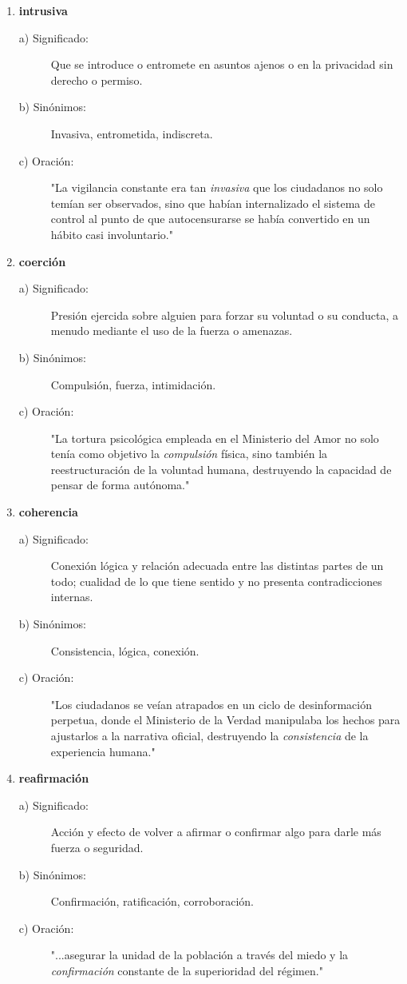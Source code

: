 \documentclass[11pt, a4paper]{article}
\begin{document}
\begin{enumerate}
    \item \textbf{intrusiva}
    \begin{description}
        \item[a) Significado:] Que se introduce o entromete en asuntos ajenos o en la privacidad sin derecho o permiso.
        \item[b) Sinónimos:] Invasiva, entrometida, indiscreta.
        \item[c) Oración:] "La vigilancia constante era tan \textit{invasiva} que los ciudadanos no solo temían ser observados, sino que habían internalizado el sistema de control al punto de que autocensurarse se había convertido en un hábito casi involuntario."
    \end{description}

    \item \textbf{coerción}
    \begin{description}
        \item[a) Significado:] Presión ejercida sobre alguien para forzar su voluntad o su conducta, a menudo mediante el uso de la fuerza o amenazas.
        \item[b) Sinónimos:] Compulsión, fuerza, intimidación.
        \item[c) Oración:] "La tortura psicológica empleada en el Ministerio del Amor no solo tenía como objetivo la \textit{compulsión} física, sino también la reestructuración de la voluntad humana, destruyendo la capacidad de pensar de forma autónoma."
    \end{description}

    \item \textbf{coherencia}
    \begin{description}
        \item[a) Significado:] Conexión lógica y relación adecuada entre las distintas partes de un todo; cualidad de lo que tiene sentido y no presenta contradicciones internas.
        \item[b) Sinónimos:] Consistencia, lógica, conexión.
        \item[c) Oración:] "Los ciudadanos se veían atrapados en un ciclo de desinformación perpetua, donde el Ministerio de la Verdad manipulaba los hechos para ajustarlos a la narrativa oficial, destruyendo la \textit{consistencia} de la experiencia humana."
    \end{description}

    \item \textbf{reafirmación}
    \begin{description}
        \item[a) Significado:] Acción y efecto de volver a afirmar o confirmar algo para darle más fuerza o seguridad.
        \item[b) Sinónimos:] Confirmación, ratificación, corroboración.
        \item[c) Oración:] "...asegurar la unidad de la población a través del miedo y la \textit{confirmación} constante de la superioridad del régimen."
    \end{description}


\end{enumerate}
\end{document}
